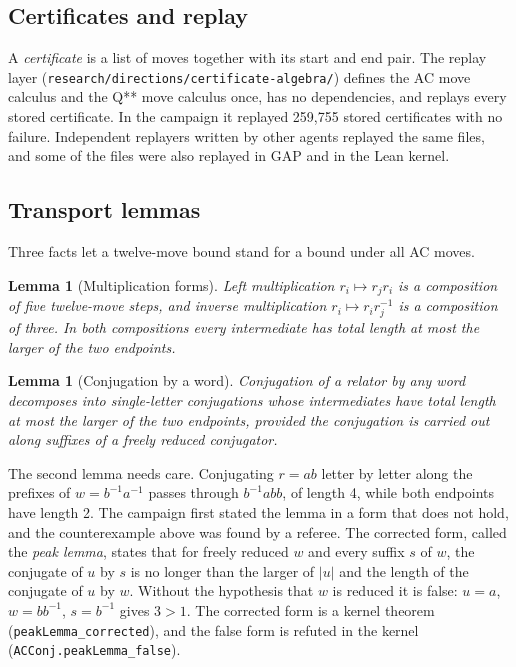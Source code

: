 \documentclass[11pt,a4paper]{article}
\newtheorem{lemma}[theorem]{Lemma}
\theoremstyle{definition}
\newcommand{\inv}[1]{#1^{-1}}
\begin{document}
\subsection{Certificates and replay}

A \emph{certificate} is a list of moves together with its start and end pair. The replay layer (\texttt{research/directions/certificate-algebra/}) defines the AC move calculus and the Q** move calculus once, has no dependencies, and replays every stored certificate. In the campaign it replayed 259,755 stored certificates with no failure. Independent replayers written by other agents replayed the same files, and some of the files were also replayed in GAP and in the Lean kernel.

\subsection{Transport lemmas}\label{sec:transport}

Three facts let a twelve-move bound stand for a bound under all AC moves.

\begin{lemma}[Multiplication forms]
Left multiplication $r_i\mapsto r_jr_i$ is a composition of five twelve-move steps, and inverse multiplication $r_i\mapsto r_i\inv{r_j}$ is a composition of three. In both compositions every intermediate has total length at most the larger of the two endpoints.
\end{lemma}

\begin{lemma}[Conjugation by a word]
Conjugation of a relator by any word decomposes into single-letter conjugations whose intermediates have total length at most the larger of the two endpoints, provided the conjugation is carried out along suffixes of a freely reduced conjugator.
\end{lemma}

The second lemma needs care. Conjugating $r=ab$ letter by letter along the prefixes of $w=\inv{b}\inv{a}$ passes through $\inv{b}abb$, of length 4, while both endpoints have length 2. The campaign first stated the lemma in a form that does not hold, and the counterexample above was found by a referee. The corrected form, called the \emph{peak lemma}, states that for freely reduced $w$ and every suffix $s$ of $w$, the conjugate of $u$ by $s$ is no longer than the larger of $|u|$ and the length of the conjugate of $u$ by $w$. Without the hypothesis that $w$ is reduced it is false: $u=a$, $w=b\inv{b}$, $s=\inv{b}$ gives $3>1$. The corrected form is a kernel theorem (\texttt{peakLemma\_corrected}), and the false form is refuted in the kernel (\texttt{ACConj.peakLemma\_false}).
\end{document}
